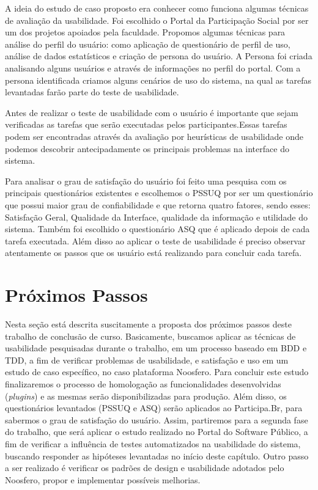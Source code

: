 A ideia do estudo de caso proposto era conhecer como funciona algumas técnicas de avaliação da usabilidade. Foi escolhido o Portal da Participação Social por ser um dos projetos apoiados pela faculdade.
%
Propomos algumas técnicas para análise do perfil do usuário: como aplicação de questionário de perfil de uso, análise de dados estatísticos e criação de persona do usuário.
%
A Persona foi criada analisando alguns usuários e através de informações no perfil do portal.
%
Com a persona identificada criamos alguns cenários de uso do sistema, na qual as tarefas levantadas farão parte do teste de usabilidade.

Antes de realizar o teste de usabilidade com o usuário é importante que sejam verificadas as tarefas que serão executadas pelos participantes.Essas tarefas podem ser encontradas através da avaliação por heurísticas de usabilidade onde podemos descobrir antecipadamente os principais problemas na interface do sistema.

Para analisar o grau de satisfação do usuário foi feito uma pesquisa com os principais questionários existentes e escolhemos o PSSUQ por ser um questionário que possui maior grau de confiabilidade e que retorna quatro fatores, sendo esses: Satisfação Geral, Qualidade da Interface, qualidade da informação e utilidade do sistema.
%
Também foi escolhido o questionário ASQ que é aplicado depois de cada tarefa executada. Além disso ao aplicar o teste de usabilidade é preciso observar atentamente os passos que os usuário está realizando para concluir cada tarefa.


\section{Próximos Passos}

Nesta seção está descrita suscitamente a proposta dos próximos passos deste trabalho de conclusão de curso. Basicamente, buscamos aplicar as técnicas de usabilidade pesquisadas durante o trabalho, em um processo baseado em BDD e TDD, a fim de verificar problemas de usabilidade, e satisfação e uso em um estudo de caso específico, no caso plataforma Noosfero. 
%
Para concluir este estudo finalizaremos  o processo de  homologação as funcionalidades desenvolvidas (\textit{plugins}) e as mesmas serão disponibilizadas para produção.
%
Além disso, os questionários levantados (PSSUQ e ASQ) serão aplicados ao Participa.Br, para sabermos o grau de satisfação do usuário. 
%
Assim, partiremos para a segunda fase do trabalho, que será aplicar o estudo realizado  no Portal do Software Público, a fim de verificar a influência de testes automatizados na usabilidade do sistema, buscando responder as hipóteses levantadas no início deste capítulo. Outro passo a ser realizado é verificar os padrões de design e usabilidade adotados pelo Noosfero, propor e implementar possíveis melhorias.

